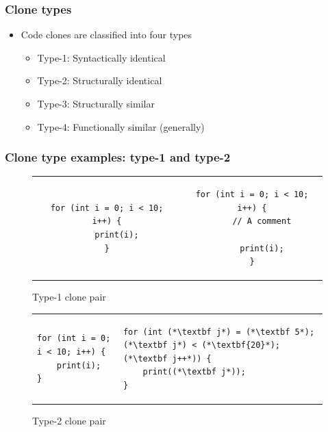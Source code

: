 \documentclass[aspectratio=1610, xcolor=table]{beamer}
\begin{document}
\begin{frame}
	\frametitle{Clone types}
	\begin{itemize}
		\item Code clones are classified into four types
		      \begin{itemize}
			      \item Type-1: Syntactically identical
			      \item Type-2: Structurally identical
			      \item Type-3: Structurally similar
			      \item Type-4: Functionally similar (generally)
		      \end{itemize}
	\end{itemize}
\end{frame}


\begin{frame}[fragile]
	\frametitle{Clone type examples: type-1 and type-2}
    \begin{figure}[t]
		\begin{center}
			\begin{tabular}{c | c}
				\begin{lstlisting}
for (int i = 0; i < 10;   i++) {
    print(i);
}
\end{lstlisting} &
				\begin{lstlisting}
for (int i = 0; i < 10; i++) {
    // A comment

    print(i);
}
            \end{lstlisting}
			\end{tabular}
		\end{center}
        \caption{Type-1 clone pair}
    \end{figure}
    \begin{figure}[t]
        	\begin{center}
        \begin{tabular}{p{6cm} | p{6cm}}
\begin{lstlisting}
for (int i = 0; i < 10; i++) {
    print(i);
}
\end{lstlisting} & \begin{lstlisting}
for (int (*\textbf j*) = (*\textbf 5*); (*\textbf j*) < (*\textbf{20}*); (*\textbf j++*)) {
    print((*\textbf j*));
}
\end{lstlisting}
		\end{tabular}
	\end{center}

        \caption{Type-2 clone pair}
    \end{figure}

\end{frame}
\end{document}
